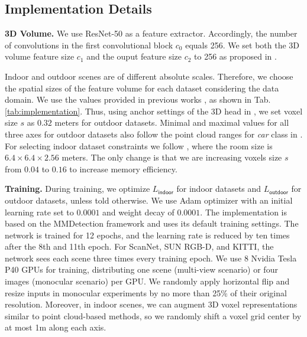 \documentclass[10pt,twocolumn,letterpaper]{article}
\begin{document}
\subsection{Implementation Details} \label{sec:implementation}

\textbf{3D Volume.} We use ResNet-50 \cite{he2016resnet} as a feature extractor. Accordingly, the number of convolutions in the first convolutional block $c_0$ equals 256. We set both the 3D volume feature size $c_1$ and the ouput feature size $c_2$ to 256 as proposed in \cite{lang2019pointpillars, yan2018second}.

Indoor and outdoor scenes are of different absolute scales. Therefore, we choose the spatial sizes of the feature volume for each dataset considering the data domain. We use the values provided in previous works \cite{murez2020atlas, lang2019pointpillars, yan2018second, sindagi2019mvxnet}, as shown in Tab. \ref{tab:implementation}. Thus, using anchor settings of the 3D head in \cite{lang2019pointpillars, sindagi2019mvxnet}, we set voxel size $s$ as $0.32$ meters for outdoor datasets. Minimal and maximal values for all three axes for outdoor datasets also follow the point cloud ranges for \textit{car} class in \cite{lang2019pointpillars, sindagi2019mvxnet}. For selecting indoor dataset constraints we follow \cite{murez2020atlas}, where the room size is $6.4 \times 6.4 \times 2.56$ meters. The only change is that we are increasing voxels size $s$ from $0.04$ to $0.16$ to increase memory efficiency. 

\textbf{Training.} During training, we optimize $L_\mathsf{indoor}$ for indoor datasets and $L_\mathsf{outdoor}$ for outdoor datasets, unless told otherwise. We use Adam optimizer with an initial learning rate set to $0.0001$ and weight decay of $0.0001$. The implementation is based on the MMDetection framework \cite{chen2019mmdetection} and uses its default training settings. The network is trained for 12 epochs, and the learning rate is reduced by ten times after the 8th and 11th epoch. For ScanNet, SUN RGB-D, and KITTI, the network sees each scene three times every training epoch. We use 8 Nvidia Tesla P40 GPUs for training, distributing one scene (multi-view scenario) or four images (monocular scenario) per GPU. We randomly apply horizontal flip and resize inputs in monocular experiments by no more than 25\% of their original resolution. Moreover, in indoor scenes, we can augment 3D voxel representations similar to point cloud-based methods, so we randomly shift a voxel grid center by at most 1m along each axis.
\end{document}
